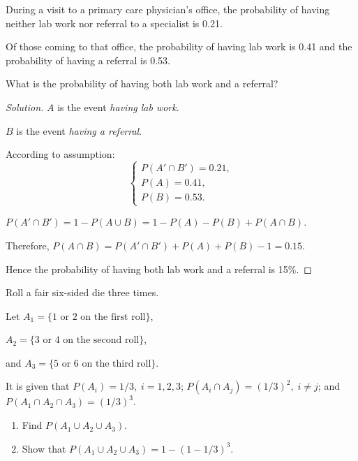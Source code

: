 \documentclass[class=probandstats,crop=false]{standalone}
\begin{document}
\begin{exercise}
    \par During a visit to a primary care physician’s office, the probability of having neither lab work nor referral to a
    specialist is 0.21.
    \par Of those coming to that office, the probability of having lab work is 0.41 and the probability of
    having a referral is 0.53.
    \par What is the probability of having both lab work and a referral?
\end{exercise}

\begin{proof}[Solution]
    \par $A$ is the event \textit{having lab work}.
    \par $B$ is the event \textit{having a referral}.
    \par According to assumption:
    \[
        \begin{cases}
            P(A'\cap B') = 0.21, \\
            P(A) = 0.41,         \\
            P(B) = 0.53.
        \end{cases}
    \]
    \par $P(A'\cap B') = 1 - P(A\cup B) = 1 - P(A) - P(B) + P(A\cap B)$.
    \par Therefore, $P(A\cap B) = P(A'\cap B') + P(A) + P(B) - 1 = 0.15$.
    \par Hence the probability of having both lab work and a referral is 15\%.
\end{proof}

\begin{exercise}
    \par Roll a fair six-sided die three times.
    \par Let $A_{1} = \{\text{1 or 2 on the first roll}\}$,
    \par $A_{2} = \{\text{3 or 4 on the second roll}\}$,
    \par and $A_{3} = \{\text{5 or 6 on the third roll}\}$.
    \par It is given that $P(A_{i}) = 1/3, \; i = 1,2,3$; $P(A_{i}\cap A_{j}) = (1/3)^{2},\; i\ne j$; and $P(A_{1}\cap A_{2}\cap A_{3}) = (1/3)^{3}$.
    \begin{enumerate}[label = \textbf{(\alph*)}]
        \item Find $P(A_{1}\cup A_{2}\cup A_{3})$.
        \item Show that $P(A_{1}\cup A_{2}\cup A_{3}) = 1 - (1 - 1/3)^{3}$.
    \end{enumerate}
\end{exercise}
\end{document}
